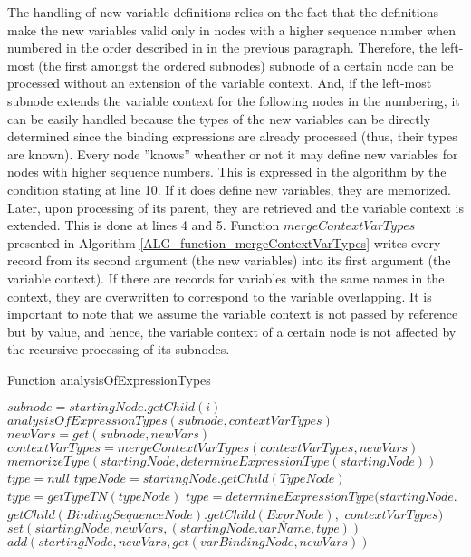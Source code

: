 The handling of new variable definitions relies on the fact that the definitions make the new variables valid only in nodes with a higher sequence number when numbered in the order described in in the previous paragraph. Therefore, the left-most (the first amongst the ordered subnodes) subnode of a certain node can be processed without an extension of the variable context. And, if the left-most subnode extends the variable context for the following nodes in the numbering, it can be easily handled because the types of the new variables can be directly determined since the binding expressions are already processed (thus, their types are known). Every node ''knows'' wheather or not it may define new variables for nodes with higher sequence numbers. This is expressed in the algorithm by the condition stating at line 10. If it does define new variables, they are memorized. Later, upon processing of its parent, they are retrieved and the variable context is extended. This is done at lines 4 and 5. Function $mergeContextVarTypes$ presented in Algorithm \ref{ALG_function_mergeContextVarTypes} writes every record from its second argument (the new variables) into its first argument (the variable context). If there are records for variables with the same names in the context, they are overwritten to correspond to the variable overlapping. It is important to note that we assume the variable context is not passed by reference but by value, and hence, the variable context of a certain node is not affected by the recursive processing of its subnodes.

\begin{algorithm}
\caption{Function analysisOfExpressionTypes}
\label{ALG_func_analysisOfExpressionTypes}
\begin{algorithmic}[1]

    \STATE $subnode = startingNode.getChild(i)$
    \STATE $analysisOfExpressionTypes(subnode, contextVarTypes)$ 
    \STATE $newVars = get(subnode, newVars)$    
    \STATE $contextVarTypes = mergeContextVarTypes(contextVarTypes, newVars)$
\ENDFOR
{}
    \STATE $memorizeType(startingNode, determineExpressionType(startingNode))$
\ENDIF
{}
    \STATE $type = null$
    \STATE $typeNode = startingNode.getChild(TypeNode)$
        \STATE $type = getTypeTN(typeNode)$
    \ELSE
        \STATE $type = determineExpressionType(startingNode.$ $getChild(BindingSequenceNode).getChild(ExprNode),$ $contextVarTypes)$
    \ENDIF
    \STATE $set(startingNode, newVars, (startingNode.varName, type))$
        \STATE $add(startingNode, newVars, get(varBindingNode, newVars))$
    \ENDFOR
\ENDIF
\end{algorithmic}
\end{algorithm}

